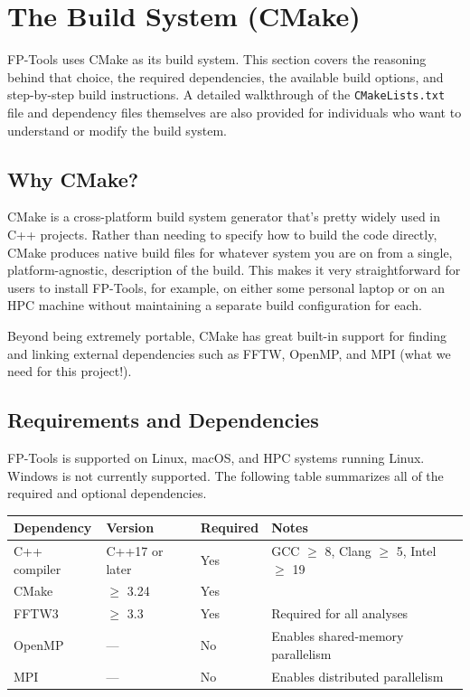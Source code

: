 \newpage
\section{The Build System (CMake)}

FP-Tools uses CMake as its build system. This section covers the reasoning
behind that choice, the required dependencies, the available build options, and
step-by-step build instructions. A detailed walkthrough of the 
\texttt{CMakeLists.txt} file and dependency files themselves are also provided 
for individuals who want to understand or modify the build system.

\subsection{Why CMake?}

CMake is a cross-platform build system generator that's pretty widely used in
C++ projects. Rather than needing to specify how to build the code directly, 
CMake produces native build files for whatever system you are on from a single,
platform-agnostic, description of the build. This makes it very straightforward 
for users to install FP-Tools, for example, on either some personal laptop or
on an HPC machine without maintaining a separate build configuration for each.
\vspace{1em}

Beyond being extremely portable, CMake has great built-in support for finding
and linking external dependencies such as FFTW, OpenMP, and MPI (what we need
for this project!). 


\subsection{Requirements and Dependencies}

FP-Tools is supported on Linux, macOS, and HPC systems running Linux. Windows
is not currently supported. The following table summarizes all of the 
required and optional dependencies.
\vspace{1em}

\begin{table}[h]
\centering
\begin{tabular}{llll}
\toprule
Dependency & Version & Required & Notes \\
\midrule
C++ compiler    & C++17 or later  & Yes & GCC $\geq$ 8, Clang $\geq$ 5, 
                                          Intel $\geq$ 19 \\
CMake           & $\geq$ 3.24     & Yes & \\
FFTW3           & $\geq$ 3.3      & Yes & Required for all analyses \\
OpenMP          & ---             & No  & Enables shared-memory parallelism \\
MPI             & ---             & No  & Enables distributed parallelism \\
\bottomrule
\end{tabular}
\label{tab:dependencies}
\end{table}


